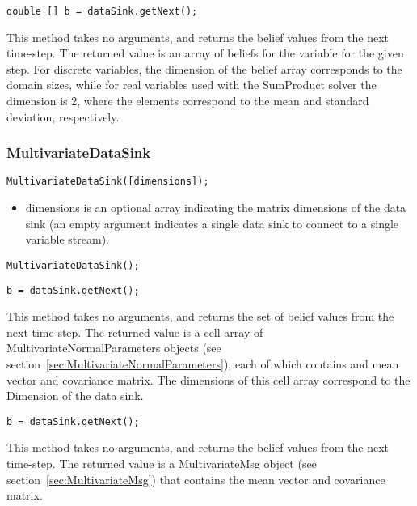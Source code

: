\fi

\ifjava
\begin{lstlisting}
double [] b = dataSink.getNext();
\end{lstlisting}

This method takes no arguments, and returns the belief values from the next time-step.  The returned value is an array of beliefs for the variable for the given step.  For discrete variables, the dimension of the belief array corresponds to the domain sizes, while for real variables used with the SumProduct solver the dimension is 2, where the elements correspond to the mean and standard deviation, respectively.
\fi

\subsubsection{MultivariateDataSink}


\ifmatlab
\begin{lstlisting}
MultivariateDataSink([dimensions]);
\end{lstlisting}

\begin{itemize}
\item dimensions is an optional array indicating the matrix dimensions of the data sink (an empty argument indicates a single data sink to connect to a single variable stream).
\end{itemize}
\fi

\ifjava
\begin{lstlisting}
MultivariateDataSink();
\end{lstlisting}
\fi


\ifmatlab
\begin{lstlisting}
b = dataSink.getNext();
\end{lstlisting}

This method takes no arguments, and returns the set of belief values from the next time-step.  The returned value is a cell array of MultivariateNormalParameters objects (see section~\ref{sec:MultivariateNormalParameters}), each of which contains and mean vector and covariance matrix.  The dimensions of this cell array correspond to the Dimension of the data sink.
\fi

\ifjava
\begin{lstlisting}
b = dataSink.getNext();
\end{lstlisting}

This method takes no arguments, and returns the belief values from the next time-step.  The returned value is a MultivariateMsg object (see section~\ref{sec:MultivariateMsg}) that contains the mean vector and covariance matrix. 
\fi



